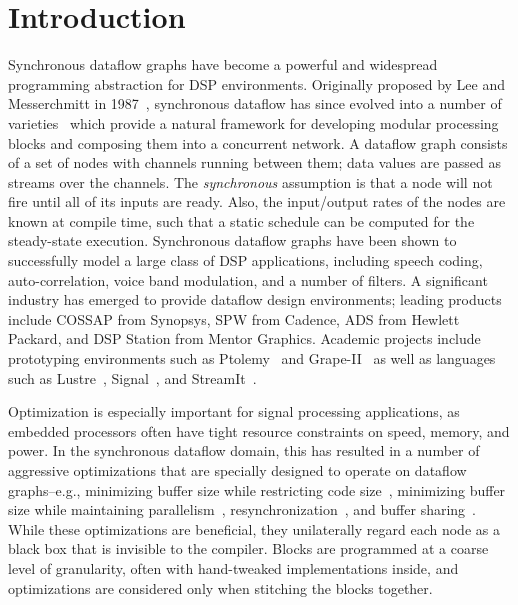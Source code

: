 \section{Introduction}

Synchronous dataflow graphs have become a powerful and widespread
programming abstraction for DSP environments.  Originally proposed by
Lee and Messerchmitt in 1987~\cite{LM87-i}, synchronous dataflow has
since evolved into a number of
varieties~\cite{BELP96,Bhatt00,Murthy2002,Buck93} which provide a
natural framework for developing modular processing blocks and
composing them into a concurrent network.  A dataflow graph consists
of a set of nodes with channels running between them; data values are
passed as streams over the channels.  The {\it synchronous} assumption
is that a node will not fire until all of its inputs are ready.  Also,
the input/output rates of the nodes are known at compile time, such
that a static schedule can be computed for the steady-state execution.
Synchronous dataflow graphs have been shown to successfully model a
large class of DSP applications, including speech coding,
auto-correlation, voice band modulation, and a number of filters.  A
significant industry has emerged to provide dataflow design
environments; leading products include COSSAP from Synopsys, SPW from
Cadence, ADS from Hewlett Packard, and DSP Station from Mentor
Graphics.  Academic projects include prototyping environments such as
Ptolemy~\cite{Lee01} and Grape-II~\cite{Lauw95} as well as languages
such as Lustre~\cite{lustre}, Signal~\cite{Gaut87}, and
StreamIt~\cite{Gordo02}.

Optimization is especially important for signal processing
applications, as embedded processors often have tight resource
constraints on speed, memory, and power.  In the synchronous dataflow
domain, this has resulted in a number of aggressive optimizations that
are specially designed to operate on dataflow graphs--e.g., minimizing
buffer size while restricting code size~\cite{murt1997x1}, minimizing
buffer size while maintaining parallelism~\cite{GGD94},
resynchronization~\cite{Bhatta2000}, and buffer
sharing~\cite{murt2001x1}.  While these optimizations are beneficial,
they unilaterally regard each node as a black box that is invisible to
the compiler.  Blocks are programmed at a coarse level of granularity,
often with hand-tweaked implementations inside, and optimizations are
considered only when stitching the blocks together.


